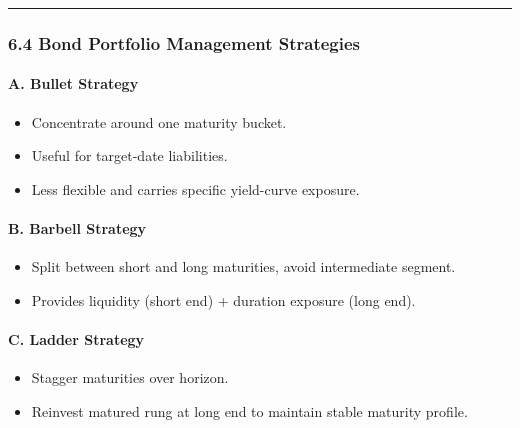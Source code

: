 \documentclass[
]{article}
\providecommand{\tightlist}{%
  \setlength{\itemsep}{0pt}\setlength{\parskip}{0pt}}
\begin{document}
\begin{center}\rule{0.5\linewidth}{0.5pt}\end{center}

\hypertarget{bond-portfolio-management-strategies}{%
\subsubsection{6.4 Bond Portfolio Management
Strategies}\label{bond-portfolio-management-strategies}}

\hypertarget{a.-bullet-strategy}{%
\paragraph{A. Bullet Strategy}\label{a.-bullet-strategy}}

\begin{itemize}
\tightlist
\item
  Concentrate around one maturity bucket.
\item
  Useful for target-date liabilities.
\item
  Less flexible and carries specific yield-curve exposure.
\end{itemize}

\hypertarget{b.-barbell-strategy}{%
\paragraph{B. Barbell Strategy}\label{b.-barbell-strategy}}

\begin{itemize}
\tightlist
\item
  Split between short and long maturities, avoid intermediate segment.
\item
  Provides liquidity (short end) + duration exposure (long end).
\end{itemize}

\hypertarget{c.-ladder-strategy}{%
\paragraph{C. Ladder Strategy}\label{c.-ladder-strategy}}

\begin{itemize}
\tightlist
\item
  Stagger maturities over horizon.
\item
  Reinvest matured rung at long end to maintain stable maturity profile.
\end{itemize}
\end{document}
